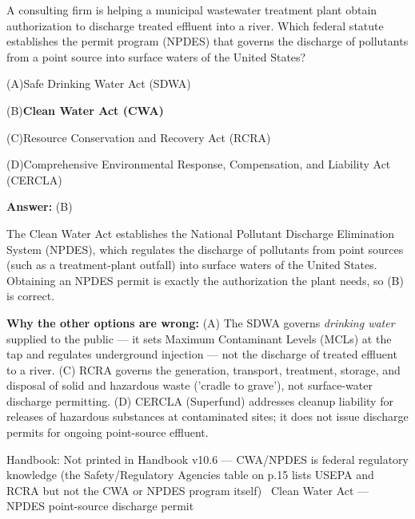 \documentclass[11pt]{article}
\newcommand{\correct}[1]{\textbf{#1}\;{\color{accent}$\checkmark$}}
\newcommand{\optline}[2]{\par\noindent\hspace{1.2em}(#1)\hspace{0.6em}#2}
\begin{document}
A consulting firm is helping a municipal wastewater treatment plant obtain authorization to discharge treated effluent into a river. Which federal statute establishes the permit program (NPDES) that governs the discharge of pollutants from a point source into surface waters of the United States?\par\par\vspace{3pt}
\optline{A}{Safe Drinking Water Act (SDWA)}
\optline{B}{\correct{Clean Water Act (CWA)}}
\optline{C}{Resource Conservation and Recovery Act (RCRA)}
\optline{D}{Comprehensive Environmental Response, Compensation, and Liability Act (CERCLA)}
\par\vspace{3pt}
\vspace{2pt}\par\noindent\colorbox{boxbg}{\parbox{\dimexpr\linewidth-2\fboxsep\relax}{%
\vspace{2pt}\textbf{Answer:} (B)\par\vspace{2pt}
{\small The Clean Water Act establishes the National Pollutant Discharge Elimination System (NPDES), which regulates the discharge of pollutants from point sources (such as a treatment-plant outfall) into surface waters of the United States. Obtaining an NPDES permit is exactly the authorization the plant needs, so (B) is correct.\par
\textbf{Why the other options are wrong:} (A) The SDWA governs \emph{drinking water} supplied to the public --- it sets Maximum Contaminant Levels (MCLs) at the tap and regulates underground injection --- not the discharge of treated effluent to a river. (C) RCRA governs the generation, transport, treatment, storage, and disposal of solid and hazardous waste ('cradle to grave'), not surface-water discharge permitting. (D) CERCLA (Superfund) addresses cleanup liability for releases of hazardous substances at contaminated sites; it does not issue discharge permits for ongoing point-source effluent.\par}\par\vspace{2pt}
{\footnotesize\color{soft}Handbook: Not printed in Handbook v10.6 --- CWA/NPDES is federal regulatory knowledge (the Safety/Regulatory Agencies table on p.15 lists USEPA and RCRA but not the CWA or NPDES program itself) \textbullet\ Clean Water Act --- NPDES point-source discharge permit}\vspace{2pt}
}}
\vspace{9pt}
\end{document}
